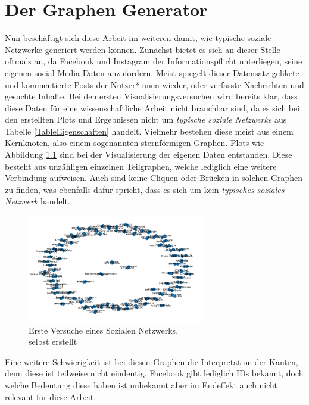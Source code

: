 \chapter{Der Graphen Generator}\label{ch:generierung}
Nun beschäftigt sich diese Arbeit im weiteren damit, wie typische soziale Netzwerke generiert werden können. 
Zunächst bietet es sich an dieser Stelle oftmals an, da Facebook und Instagram der Informationspflicht unterliegen, seine eigenen social Media Daten anzufordern. Meist spiegelt dieser Datensatz gelikete und kommentierte Posts der Nutzer*innen wieder, oder verfasste Nachrichten und gesuchte Inhalte.
Bei den ersten Visualisierungsversuchen wird bereits klar, dass diese Daten für eine wissenschaftliche Arbeit nicht brauchbar sind, da es sich bei den erstellten Plots und Ergebnissen nicht um \textit{ typische soziale Netzwerke} aus Tabelle \ref{TableEigenschaften} handelt. Vielmehr bestehen diese meist aus einem Kernknoten, also einem sogenannten sternförmigen Graphen. Plots wie Abbildung \ref{fig:OwnData} sind bei der Visualisierung der eigenen Daten entstanden. Diese besteht aus unzähligen einzelnen Teilgraphen, welche lediglich eine weitere Verbindung aufweisen. Auch sind keine Cliquen oder Brücken in solchen Graphen zu finden, was ebenfalls dafür spricht, dass es sich um kein \textit{typisches soziales Netzwerk} handelt. \\
\FloatBarrier
\begin{figure}[h!]
    \centering
    \includegraphics[width=0.7\textwidth]{Graphics/PlotOwnData.png}
    \caption{Erste Versuche eines Sozialen Netzwerks, \\
    selbst erstellt}
    \label{fig:OwnData}
\end{figure}
\FloatBarrier

Eine weitere Schwierigkeit ist bei diesen Graphen die Interpretation der Kanten, denn diese ist teilweise nicht eindeutig. 
Facebook gibt lediglich IDs bekannt, doch welche Bedeutung diese haben ist unbekannt aber im Endeffekt auch nicht relevant für diese Arbeit.

